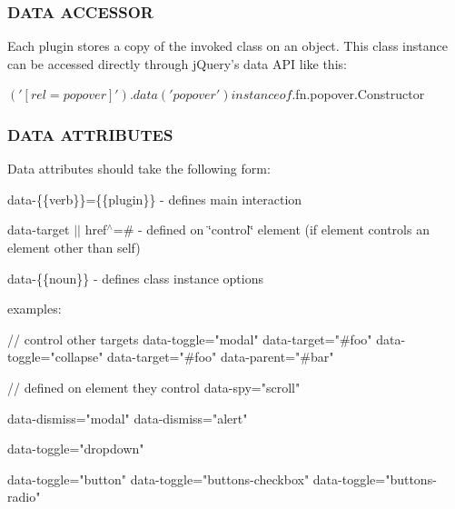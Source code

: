 \subsubsection*{D\-A\-T\-A A\-C\-C\-E\-S\-S\-O\-R}

Each plugin stores a copy of the invoked class on an object. This class instance can be accessed directly through j\-Query's data A\-P\-I like this\-: \begin{DoxyVerb}$('[rel=popover]').data('popover') instanceof $.fn.popover.Constructor
\end{DoxyVerb}






\subsubsection*{D\-A\-T\-A A\-T\-T\-R\-I\-B\-U\-T\-E\-S}

Data attributes should take the following form\-:


\begin{DoxyItemize}
\item data-\/\{\{verb\}\}=\{\{plugin\}\} -\/ defines main interaction
\item data-\/target $\vert$$\vert$ href$^\wedge$=\# -\/ defined on \char`\"{}control\char`\"{} element (if element controls an element other than self)
\item data-\/\{\{noun\}\} -\/ defines class instance options
\end{DoxyItemize}

examples\-: \begin{DoxyVerb}// control other targets
data-toggle="modal" data-target="#foo"
data-toggle="collapse" data-target="#foo" data-parent="#bar"

// defined on element they control
data-spy="scroll"

data-dismiss="modal"
data-dismiss="alert"

data-toggle="dropdown"

data-toggle="button"
data-toggle="buttons-checkbox"
data-toggle="buttons-radio" \end{DoxyVerb}
 